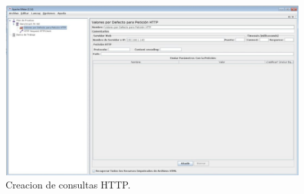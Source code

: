 \begin{figure}[H]
\begin{center}
\includegraphics[scale=0.3]{imagenes/imagen4-3.eps}
\caption{Creacion de consultas HTTP.}
\end{center}
\end{figure}

